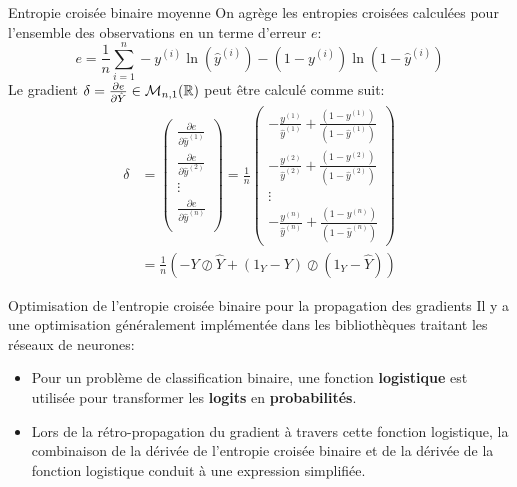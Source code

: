 \begin{frame}{Entropie croisée binaire moyenne}
	On agrège les entropies croisées calculées pour l'ensemble des observations en un terme d'erreur $e$:
	\begin{equation*}
		e = \frac{1}{n} \sum_{i=1}^n - y^{(i)} \ln{\left(\hat{y}^{(i)}\right)} - \left(1 - y^{(i)}\right) \ln{\left(1 - \hat{y}^{(i)}\right)}
	\end{equation*}
	\pause
	Le gradient $\delta = \frac{\partial{e}}{\partial{\hat{Y}}} \in \mathcal{M}_{n,1}(\mathbb{R})$ peut être calculé comme suit:
	\begin{equation*}
		\begin{aligned}
			\delta 
			&= 
			\begin{pmatrix}
				\frac{\partial{e}}{\partial{\hat{y}^{(1)}}} \\[5pt]
				\frac{\partial{e}}{\partial{\hat{y}^{(2)}}} \\[5pt]
				\vdots \\
				\frac{\partial{e}}{\partial{\hat{y}^{(n)}}} \\
			\end{pmatrix}
			= \frac{1}{n}
			\begin{pmatrix}
				-\frac{y^{(1)}}{\hat{y}^{(1)}} + \frac{\left(1 - y^{(1)}\right)}{\left(1 - \hat{y}^{(1)}\right)} \\[5pt]
				-\frac{y^{(2)}}{\hat{y}^{(2)}} + \frac{\left(1 - y^{(2)}\right)}{\left(1 - \hat{y}^{(2)}\right)} \\[5pt]
				\vdots \\
				-\frac{y^{(n)}}{\hat{y}^{(n)}} + \frac{\left(1 - y^{(n)}\right)}{\left(1 - \hat{y}^{(n)}\right)}
			\end{pmatrix} \\
			&= \frac{1}{n} \left( -Y \oslash \hat{Y} + \left(1_Y - Y\right) \oslash \left(1_Y - \hat{Y}\right)\right)
		\end{aligned}
	\end{equation*}
\end{frame}

\begin{frame}{Optimisation de l'entropie croisée binaire pour la propagation des gradients}
	Il y a une optimisation généralement implémentée dans les bibliothèques traitant les réseaux de neurones:
	\begin{itemize}
		\item Pour un problème de classification binaire, une fonction \textbf{logistique} est utilisée pour transformer les \textbf{logits} en \textbf{probabilités}.
		\item Lors de la rétro-propagation du gradient à travers cette fonction logistique, la combinaison de la dérivée de l'entropie croisée binaire et de la dérivée de la fonction logistique conduit à une expression simplifiée.
	\end{itemize}
\end{frame}

